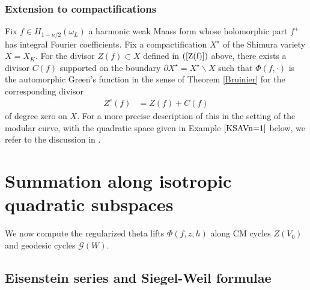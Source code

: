 \documentclass{amsart}
\theoremstyle{definition}
\theoremstyle{definition}
\theoremstyle{definition}
\begin{document}


\subsubsection{Extension to compactifications}

Fix $f \in H_{1-n/2}(\omega_L)$ a harmonic weak Maass form whose holomorphic part $f^+$ has integral Fourier coefficients. 
Fix a compactification $X^{\star}$ of the Shimura variety $X = X_K$.  
For the divisor $Z(f) \subset X$ defined in $(\ref{Z(f)})$ above, there exists a divisor $C(f)$ supported
on the boundary $\partial X^{\star} = X^{\star} \backslash X$ such that $\Phi(f, \cdot)$ is the automorphic 
Green's function in the sense of Theorem \ref{Bruinier} for the corresponding divisor 
\begin{align}\label{Z^c(f)} Z^c(f) &= Z(f) + C(f) \end{align} of degree zero on $X$.
For a more precise description of this in the setting of the modular curve, with the 
quadratic space given in Example $\ref{KSAVn=1}$ below, we refer to the discussion in \cite[$\S$7.3]{BY}.

\section{Summation along isotropic quadratic subspaces}

We now compute the regularized theta lifts $\Phi(f, z, h)$ along CM cycles $Z(V_0)$ and geodesic cycles $\mathcal{G}(W)$. 

\subsection{Eisenstein series and Siegel-Weil formulae}
\end{document}
